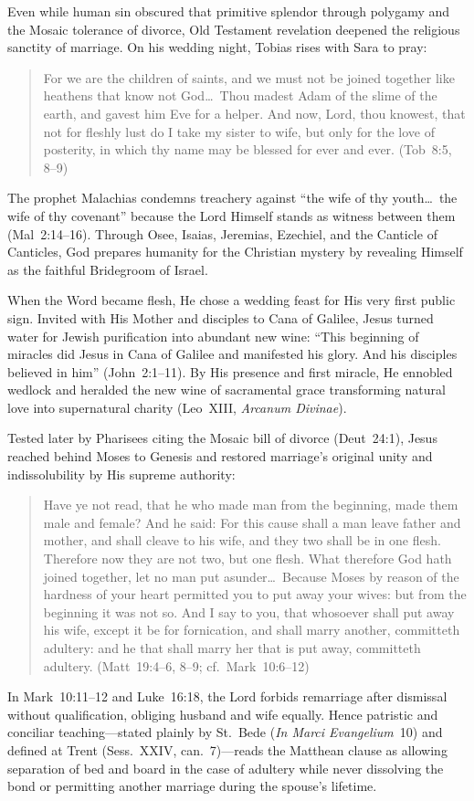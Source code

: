 Even while human sin obscured that primitive splendor through polygamy and the Mosaic tolerance of divorce, Old Testament revelation deepened the religious sanctity of marriage. On his wedding night, Tobias rises with Sara to pray:
\begin{quotation}
For we are the children of saints, and we must not be joined together like heathens that know not God\ldots\ Thou madest Adam of the slime of the earth, and gavest him Eve for a helper. And now, Lord, thou knowest, that not for fleshly lust do I take my sister to wife, but only for the love of posterity, in which thy name may be blessed for ever and ever. (Tob~8:5, 8--9)
\end{quotation}
The prophet Malachias condemns treachery against ``the wife of thy youth\ldots\ the wife of thy covenant'' because the Lord Himself stands as witness between them (Mal~2:14--16). Through Osee, Isaias, Jeremias, Ezechiel, and the Canticle of Canticles, God prepares humanity for the Christian mystery by revealing Himself as the faithful Bridegroom of Israel.

When the Word became flesh, He chose a wedding feast for His very first public sign. Invited with His Mother and disciples to Cana of Galilee, Jesus turned water for Jewish purification into abundant new wine: ``This beginning of miracles did Jesus in Cana of Galilee and manifested his glory. And his disciples believed in him'' (John~2:1--11). By His presence and first miracle, He ennobled wedlock and heralded the new wine of sacramental grace transforming natural love into supernatural charity (Leo~XIII, \emph{Arcanum Divinae}).

Tested later by Pharisees citing the Mosaic bill of divorce (Deut~24:1), Jesus reached behind Moses to Genesis and restored marriage's original unity and indissolubility by His supreme authority:
\begin{quotation}
Have ye not read, that he who made man from the beginning, made them male and female? And he said: For this cause shall a man leave father and mother, and shall cleave to his wife, and they two shall be in one flesh. Therefore now they are not two, but one flesh. What therefore God hath joined together, let no man put asunder\ldots\ Because Moses by reason of the hardness of your heart permitted you to put away your wives: but from the beginning it was not so. And I say to you, that whosoever shall put away his wife, except it be for fornication, and shall marry another, committeth adultery: and he that shall marry her that is put away, committeth adultery. (Matt~19:4--6, 8--9; cf.~Mark~10:6--12)
\end{quotation}
In Mark~10:11--12 and Luke~16:18, the Lord forbids remarriage after dismissal without qualification, obliging husband and wife equally. Hence patristic and conciliar teaching---stated plainly by St.~Bede (\emph{In Marci Evangelium}~10) and defined at Trent (Sess.~XXIV, can.~7)---reads the Matthean clause as allowing separation of bed and board in the case of adultery while never dissolving the bond or permitting another marriage during the spouse's lifetime.

